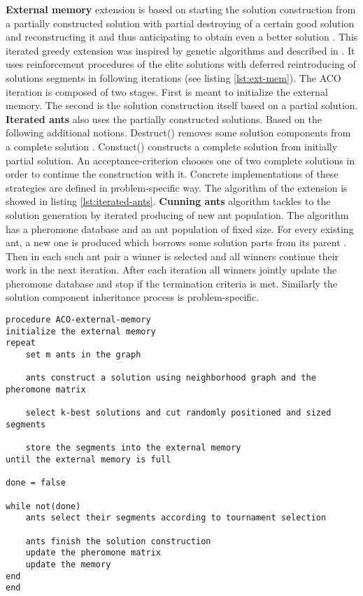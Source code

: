 \documentclass[11pt,a4paper,oneside]{book}
\begin{document}
\textbf{External memory} extension is based on starting the solution construction from a partially constructed solution with partial destroying of a certain good solution and reconstructing it and thus anticipating to obtain even a better solution \cite{iterated_greedy}. This iterated greedy extension was inspired by genetic algorithms and described in \cite{external_memory}. It uses reinforcement procedures of the elite solutions with deferred reintroducing of solutions segments in following iterations (see listing \ref{lst:ext-mem}). The ACO iteration is composed of two stages. First is meant to initialize the external memory. The second is the solution construction itself based on a partial solution. \textbf{Iterated ants} also uses the partially constructed solutions. Based on the following additional notions. Destruct() removes some solution components from a complete solution \cite{iterated_ants}. Constuct() constructs a complete solution from initially partial solution. An acceptance-criterion chooses one of two complete solutions in order to continue the construction with it. Concrete implementations of these strategies are defined in problem-specific way. The algorithm of the extension is showed in listing \ref{lst:iterated-ants}. \textbf{Cunning ants} algorithm tackles to the solution generation by iterated producing of new ant population. The algorithm has a pheromone database and an ant population of fixed size. For every existing ant, a new one is produced which borrows some solution parts from its parent \cite{cunning_ants}. Then in each such ant pair a winner is selected and all winners continue their work in the next iteration. After each iteration all winners jointly update the pheromone database and stop if the termination criteria is met. Similarly the solution component inheritance process is problem-specific. 

\begin{minipage}[c, breaklines=true]{0.95\textwidth}
\begin{lstlisting}[caption={External memory iteration pseudo-code}, label={lst:ext-mem}]
procedure ACO-external-memory
initialize the external memory
repeat
	set m ants in the graph
	
	ants construct a solution using neighborhood graph and the pheromone matrix
	
	select k-best solutions and cut randomly positioned and sized segments
	
	store the segments into the external memory
until the external memory is full

done = false

while not(done)
	ants select their segments according to tournament selection
	
	ants finish the solution construction
	update the pheromone matrix
	update the memory
end
end
\end{lstlisting}
\end{minipage}
\end{document}
